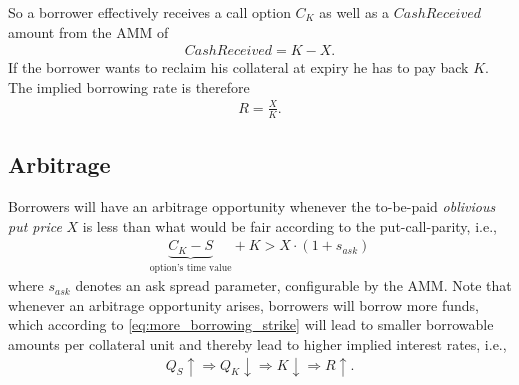 \documentclass[a4paper]{article}
\begin{document}
So a borrower effectively receives a call option $C_K$ as well as a $CashReceived$ amount from the AMM of
\begin{equation}
\begin{split}
CashReceived=K-X.
\end{split}
\end{equation}
If the borrower wants to reclaim his collateral at expiry he has to pay back $K$. The implied borrowing rate is therefore
\begin{equation}
\begin{split}
R = \frac{X}{K}.
\end{split}
\end{equation}





\subsection{Arbitrage}
\label{sec:arbitrage}
Borrowers will have an arbitrage opportunity whenever the to-be-paid \emph{oblivious put price} $X$ is less than what would be fair according to the put-call-parity, i.e.,
\begin{equation}
\begin{split}
\label{eq:arbitrage_borrowers}
\underbrace{C_K - S}_{\textrm{option's time value}} + K > X \cdot (1+s_{ask})
\end{split}
\end{equation}
where $s_{ask}$ denotes an ask spread parameter, configurable by the AMM. Note that whenever an arbitrage opportunity arises, borrowers will borrow more funds, which according to \cref{eq:more_borrowing_strike} will lead to smaller borrowable amounts per collateral unit and thereby lead to higher implied interest rates, i.e.,
\begin{equation}
\begin{split}
Q_S\uparrow \Rightarrow Q_K\downarrow \Rightarrow K\downarrow \Rightarrow R\uparrow.
\end{split}
\end{equation}
\end{document}
